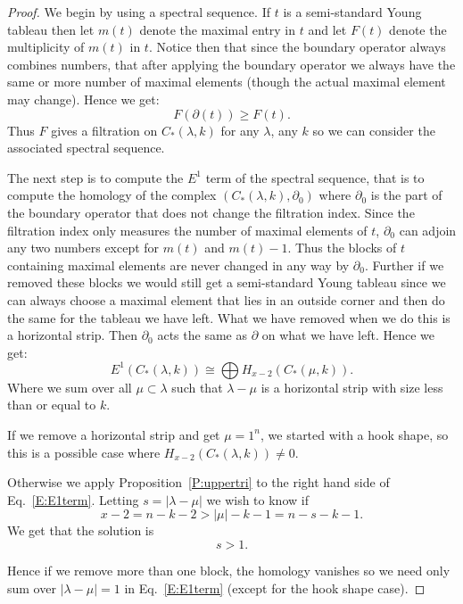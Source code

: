 \documentclass{amsart}
\begin{document}
\begin{proof}
  We begin by using a spectral sequence. If $t$ is a semi-standard Young tableau then let $m(t)$ denote the maximal entry
  in $t$ and let $F(t)$ denote the multiplicity of $m(t)$
  in $t$. Notice then that since the boundary operator always combines numbers, that after applying
  the boundary operator we always have the same or more number of maximal elements (though the actual maximal element 
  may change).
  Hence we get:  $$F(\partial(t)) \ge F(t).$$  Thus $F$ gives a filtration on $C_*(\lambda, k)$ for any $\lambda$, any $k$ so
  we can consider the associated spectral sequence. 

  The next step is to compute the $E^1$ term of the spectral sequence, that is to compute the homology of the complex
  $(C_*(\lambda, k), \partial_0)$ where $\partial_0$ is the part of the boundary operator that does not change the 
  filtration index. Since the filtration index only measures the number of maximal elements of $t$, $\partial_0$ can adjoin
  any two numbers except for $m(t)$ and $m(t)-1$. Thus the blocks of $t$ containing maximal elements are never
  changed in any way by $\partial_0$. Further if we removed these blocks we would still get a semi-standard Young tableau
  since we can always choose a maximal element that lies in an outside corner and then do the same for the tableau we 
  have left. What we have removed when we do this is a horizontal strip. Then $\partial_0$ acts the same as $\partial$ on 
  what we have left. Hence we get:
  \begin{equation}\label{E:E1term}
    E^1(C_*(\lambda, k)) \cong \bigoplus H_{x-2}(C_*(\mu, k)).
  \end{equation}
  Where we sum over all $\mu \subset \lambda$ such that $\lambda - \mu$ is a horizontal strip with size less than or equal to $k$.

  If we remove a horizontal 
  strip and get $ \mu =1^n$, we started with a hook shape, so this is a possible case where $H_{x-2}(C_*(\lambda,k)) \ne 0$.

  Otherwise we apply Proposition~\ref{P:uppertri} to the right hand side of Eq.~\ref{E:E1term}. Letting $s=|\lambda - \mu|$
  we wish to know if 
  $$ x-2=n-k-2 >|\mu| -k -1=n-s-k-1.$$ We get that the solution is $$s > 1.$$ 

  Hence if we remove more than one block, the
  homology vanishes so we need only sum over $|\lambda - \mu| = 1$ in Eq.~\ref{E:E1term} (except for the hook  
  shape case). 


\end{proof}
\end{document}
